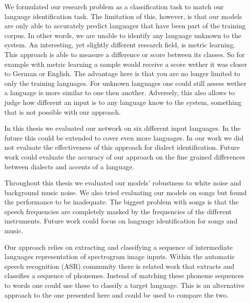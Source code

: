 We formulated our research problem as a classification task to match our language identification task. The limitation of this, however, is that our models are only able to accurately predict languages that have been part of the training corpus. In other words, we are unable to identify any language unknown to the system. An interesting, yet slightly different research field, is metric learning. This approach is able to measure a difference or score between its classes. So for example with metric learning a sample would receive a score wether it was closer to German or English. The advantage here is that you are no longer limited to only the training languages. For unknown languages one could still assess wether a language is more similar to one then another. Adversely, this also allows to judge how different an input is to any language know to the system, something that is not possible with our approach.

In this thesis we evaluated our network on six different input languages. In the future this could be extended to cover even more languages. In our work we did not evaluate the effectiveness of this approach for dialect identification. Future work could evaluate the accuracy of our approach on the fine grained differences between dialects and accents of a language.

Throughout this thesis we evaluated our models' robustness to white noise and background music noise. We also tried evaluating our models on songs but found the performance to be inadequate. The biggest problem with songs is that the speech frequencies are completely masked by the frequencies of the different instruments. Future work could focus on language identification for songs and music.

Our approach relies on extracting and classifying a sequence of intermediate languages representation of spectrogram image inputs. Within the automatic speech recognition (ASR) community there is related work\cite{song2015end}   that extracts and classifies a sequence of phonemes. Instead of matching these phoneme sequences to words one could use these to classify a target language. This is an alternative approach to the one presented here and could be used to compare the two.

